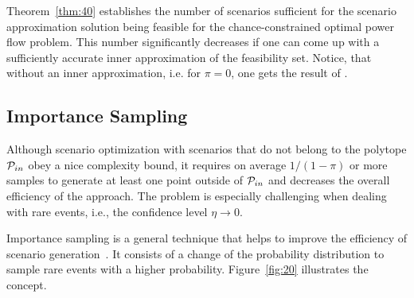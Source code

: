 \documentclass{IEEEtran4PSCC}
\newcommand{\cP}{{\cal P}}
\begin{document}
Theorem~\ref{thm:40} establishes the number of scenarios sufficient for the scenario approximation solution being feasible for the chance-constrained optimal power flow problem. This number significantly decreases if one can come up with a sufficiently accurate inner approximation of the feasibility set. Notice, that without an inner approximation, i.e. for $\pi = 0$, one gets the result of \cite[Theorem 1]{calafiore2006scenario}. %

\subsection{Importance Sampling}

Although scenario optimization with scenarios that do not belong to the polytope $\cP_{in}$ obey a nice complexity bound, it requires on average $1/(1-\pi)$ or more samples to generate at least one point outside of $\cP_{in}$ and decreases the overall efficiency of the approach. The problem is especially challenging when dealing with rare events, i.e., the confidence level $\eta \to 0$. 

Importance sampling is a general technique that helps to improve the efficiency of scenario generation~\cite{tokdar2010importance}. It consists of a change of the probability distribution to sample rare events with a higher probability. Figure~\ref{fig:20} illustrates the concept. 

\end{document}
